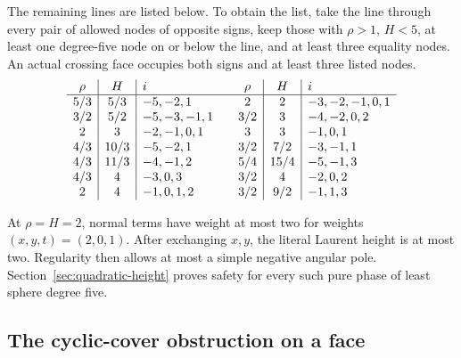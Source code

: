 The remaining lines are listed below. To obtain the list, take the line
through every pair of allowed nodes of opposite signs, keep those with
\(\rho>1\), \(H<5\), at least one degree-five node on or below the line,
and at least three equality nodes. An actual crossing face occupies both
signs and at least three listed nodes.
\[
\begin{array}{c|c|l@{\qquad}c|c|l}
\rho&H&i&\rho&H&i\\ \hline
5/3&5/3&-5,-2,1&2&2&-3,-2,-1,0,1\\
3/2&5/2&-5,-3,-1,1&3/2&3&-4,-2,0,2\\
2&3&-2,-1,0,1&3&3&-1,0,1\\
4/3&10/3&-5,-2,1&3/2&7/2&-3,-1,1\\
4/3&11/3&-4,-1,2&5/4&15/4&-5,-1,3\\
4/3&4&-3,0,3&3/2&4&-2,0,2\\
2&4&-1,0,1,2&3/2&9/2&-1,1,3
\end{array}
\]

At \(\rho=H=2\), normal terms have weight at most two for weights
\((x,y,t)=(2,0,1)\). After exchanging \(x,y\), the literal Laurent height
is at most two. Regularity then allows at most a simple negative angular
pole. Section~\ref{sec:quadratic-height} proves safety for every such pure
phase of least sphere degree five.

\subsection{The cyclic-cover obstruction on a face}\label{sec:cyclic-face}

